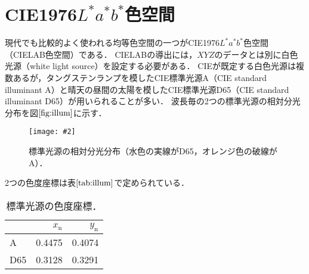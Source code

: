 \documentclass[uplatex,paper=a4,fontsize=4.0truemm,jafontsize=4.0truemm,head_space=30.0truemm,foot_space=30.0truemm,baselineskip=8.0truemm,line_length=40zw,gutter=25.0truemm,oneside,openany,fleqn,hanging_panctuation,open_bracket_pos=nibu_tentsuki,dvipdfmx,jis2004,book,titlepage]{jlreq}
\theoremstyle{mystyle}
\newcommand{\captiondot}[1]{\caption{#1．}}
\newcommand{\figureinput}[4]{\begin{figure}[btp]\centering\texttt{[image: \#2]}\captiondot{#3}\label{fig:#4}\end{figure}}
\newcommand{\tableinput}[4]{\begin{table}[btp]\centering\captiondot{#3}\label{tab:#4}\begin{tabular}{#1}#2\end{tabular}\end{table}}
\newcommand{\mathdisplaystyle}[1]{\(\displaystyle{#1}\)}
\newcommand{\Reference}[1]{\mathdisplaystyle{\ref{#1}}}
\begin{document}
		\section{CIE1976\mathdisplaystyle{L^\ast a^\ast b^\ast}色空間}
			現代でも比較的よく使われる均等色空間の一つがCIE1976\mathdisplaystyle{L^\ast a^\ast b^\ast}色空間（CIELAB色空間）である．
			CIELABの導出には，\mathdisplaystyle{XYZ}のデータとは別に白色光源（white light source）を設定する必要がある．
			CIEが既定する白色光源は複数あるが，タングステンランプを模したCIE標準光源A（CIE standard illuminant A）と晴天の昼間の太陽を模したCIE標準光源D65（CIE standard illuminant D65）が用いられることが多い．
			波長毎の2つの標準光源の相対分光分布を図\Reference{fig:illum}に示す．
			\figureinput{width=\linewidth}{D:/a/figs/illuminant.png}{標準光源の相対分光分布（水色の実線がD65，オレンジ色の破線がA）}{illum}
			2つの色度座標は表\Reference{tab:illum}で定められている．
			\tableinput{l|rr}{ & \(x_\textrm{n}\) & \(y_\textrm{n}\) \\ \hline
				A & 0.4475 & 0.4074 \\
				D65 & 0.3128 & 0.3291}{標準光源の色度座標}{illum}
\end{document}
